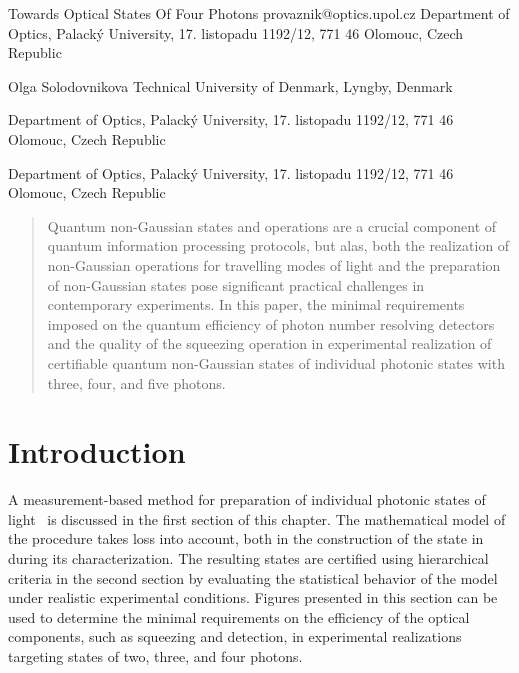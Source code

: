 \documentclass{article}
\begin{document}
\ArticleTitle
  {Towards Optical States Of Four Photons}
  {provaznik@optics.upol.cz}
\ArticleAuthorAddress
  {Department of Optics, Palack\'{y} University, 17. listopadu 1192/12, 771 46 Olomouc, Czech Republic}

\ArticleAuthor
  {Olga Solodovnikova}
\ArticleAuthorAddress
  {Technical University of Denmark, Lyngby, Denmark}

\ArticleAuthorAddress
  {Department of Optics, Palack\'{y} University, 17. listopadu 1192/12, 771 46 Olomouc, Czech Republic}

\ArticleAuthorAddress
  {Department of Optics, Palack\'{y} University, 17. listopadu 1192/12, 771 46 Olomouc, Czech Republic}

\ArticleTitlePrint

\begin{abstract}\noindent
  Quantum non-Gaussian states and operations are a crucial component of quantum information processing protocols, but alas, both the realization of non-Gaussian operations for travelling modes of light and the preparation of non-Gaussian states pose significant practical challenges in contemporary experiments. In this paper, the minimal requirements imposed on the quantum efficiency of photon number resolving detectors and the quality of the squeezing operation in experimental realization of certifiable quantum non-Gaussian states of individual photonic states with three, four, and five photons.
\end{abstract}

%
%

\section{Introduction}

A measurement-based method for preparation of individual photonic states of light~\cite{yukawa2013a,yoshikawa2018,tiedau2019,provaznik2020} is discussed in the first section of this chapter. The mathematical model of the procedure takes loss into account, both in the construction of the state in during its characterization. The resulting states are certified using hierarchical criteria \cite{lachman2019} in the second section by evaluating the statistical behavior of the model under realistic experimental conditions. Figures presented in this section can be used to determine the minimal requirements on the efficiency of the optical components, such as squeezing and detection, in experimental realizations targeting states of two, three, and four photons.
\end{document}
